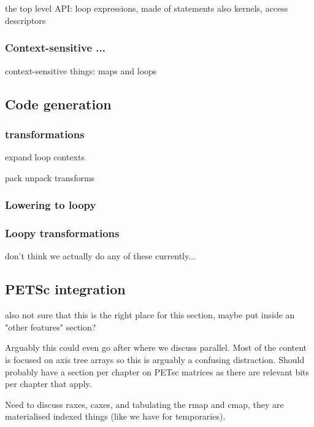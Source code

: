 \documentclass[thesis]{subfiles}
\begin{document}
\chapter{}

the top level API:
loop expressions, made of statements
also kernels, access descriptors


\subsection{Context-sensitive ...}

context-sensitive things: maps and loops

\section{Code generation}

\subsection{ transformations}

expand loop contexts

pack unpack transforms

\subsection{Lowering to loopy}

\subsection{Loopy transformations}

don't think we actually do any of these currently...

\section{PETSc integration}

also not sure that this is the right place for this section, maybe put inside an "other features" section?

Arguably this could even go after where we discuss parallel. Most of the content is focused on axis tree arrays so this is arguably a confusing distraction. Should probably have a section per chapter on PETsc matrices as there are relevant bits per chapter that apply.

Need to discuss raxes, caxes, and tabulating the rmap and cmap, they are materialised indexed things (like we have for temporaries).
\end{document}
